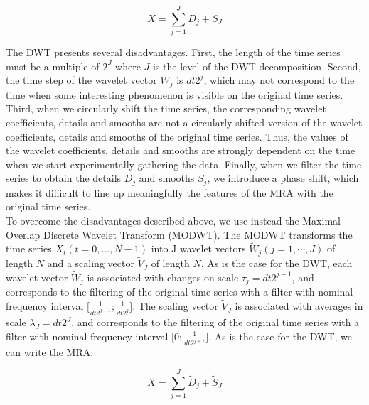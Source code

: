 \documentclass{article}
\begin{document}
\begin{linenomath*}
\begin{equation}
X = \sum_{j = 1}^{J} D_j + S_J
\end{equation}
\end{linenomath*}

The DWT presents several disadvantages. First, the length of the time series must be a multiple of $2^J$ where $J$ is the level of the DWT decomposition. Second, the time step of the wavelet vector $W_j$ is $dt 2^j$, which may not correspond to the time when some interesting phenomenon is visible on the original time series. Third, when we circularly shift the time series, the corresponding wavelet coefficients, details and smooths are not a circularly shifted version of the wavelet coefficients, details and smooths of the original time series. Thus, the values of the wavelet coefficients, details and smooths are strongly dependent on the time when we start experimentally gathering the data. Finally, when we filter the time series to obtain the details $D_j$ and smooths $S_j$, we introduce a phase shift, which makes it difficult to line up meaningfully the features of the MRA with the original time series. \\

To overcome the disadvantages described above, we use instead the Maximal Overlap Discrete Wavelet Transform (MODWT). The MODWT transforms the time series $X_t \left( t = 0, ... , N - 1 \right)$ into J wavelet vectors $\widetilde{W}_j \left( j = 1 ,  \cdots , J \right)$ of length $N$ and a scaling vector $\widetilde{V}_J$ of length $N$. As is the case for the DWT, each wavelet vector $\widetilde{W}_j$ is associated with changes on scale $\tau_j = dt 2^{j - 1}$, and corresponds to the filtering of the original time series with a filter with nominal frequency interval $\lbrack \frac{1}{dt 2^{j + 1}} ; \frac{1}{dt 2^j} \rbrack$. The scaling vector $\widetilde{V}_J$ is associated with averages in scale $\lambda_J = dt 2^J$, and corresponds to the filtering of the original time series with a filter with nominal frequency interval $\lbrack 0 ; \frac{1}{dt 2^{j + 1}} \rbrack$. As is the case for the DWT, we can write the MRA:

\begin{linenomath*}
\begin{equation}
X = \sum_{j = 1}^{J} \widetilde{D}_j + \widetilde{S}_J
\end{equation}
\end{linenomath*}
\end{document}
